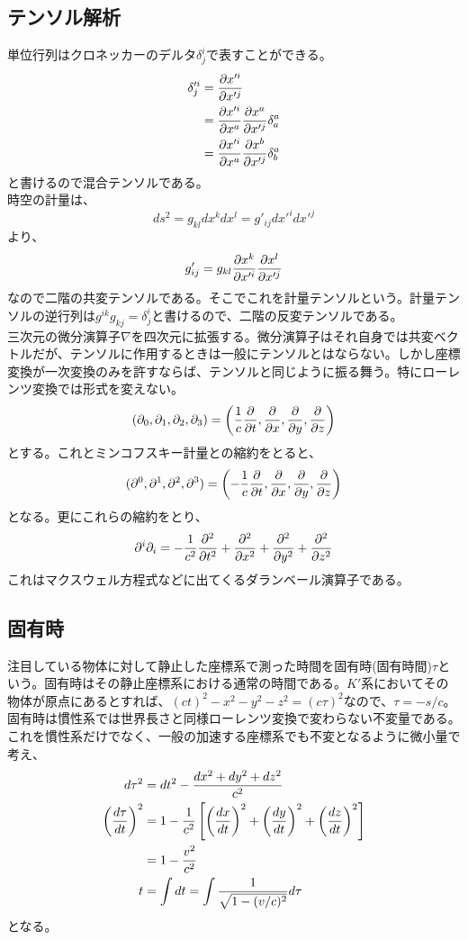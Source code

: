         \subsection{テンソル解析}
            単位行列はクロネッカーのデルタ$\delta^i_j$で表すことができる。
            \begin{align*}
                \delta'^i_j &= \pd[x'^i]{x'^j}\\
                &= \pd[x'^i]{x^a}\pd[x^a]{x'^j}\delta^a_a\\
                &= \pd[x'^i]{x^a}\pd[x^b]{x'^j}\delta^a_b
            \end{align*}
            と書けるので混合テンソルである。\\
            時空の計量は、
                \[ds^2 = g_{kl}dx^kdx^l = g'_{ij}dx'^idx'^j\]
            より、
                \[g'_{ij} = g_{kl}\pd[x^k]{x'^i}\pd[x^l]{x'^j}\]
            なので二階の共変テンソルである。そこでこれを計量テンソルという。計量テンソルの逆行列は$g^{ik}g_{kj}=\delta^i_j$と書けるので、二階の反変テンソルである。\\
            三次元の微分演算子$\nabla$を四次元に拡張する。微分演算子はそれ自身では共変ベクトルだが、テンソルに作用するときは一般にテンソルとはならない。しかし座標変換が一次変換のみを許すならば、テンソルと同じように振る舞う。特にローレンツ変換では形式を変えない。
                \[(\pa_0,\pa_1,\pa_2,\pa_3) = \lr{\rec{c}\pd{t},\pd{x},\pd{y},\pd{z}}\]
            とする。これとミンコフスキー計量との縮約をとると、
                \[(\pa^0,\pa^1,\pa^2,\pa^3) = \lr{-\rec{c}\pd{t},\pd{x},\pd{y},\pd{z}}\]
            となる。更にこれらの縮約をとり、
                \[\pa^i\pa_i = -\rec{c^2}\pd[^2]{t^2} + \pd[^2]{x^2}+\pd[^2]{y^2}+\pd[^2]{z^2}\]
            これはマクスウェル方程式などに出てくるダランベール演算子である。
        \subsection{固有時}
            注目している物体に対して静止した座標系で測った時間を固有時(固有時間)$\tau$という。固有時はその静止座標系における通常の時間である。$K'$系においてその物体が原点にあるとすれば、$(ct)^2-x^2-y^2-z^2=(c\tau)^2$なので、$\tau=-s/c$。固有時は慣性系では世界長さと同様ローレンツ変換で変わらない不変量である。これを慣性系だけでなく、一般の加速する座標系でも不変となるように微小量で考え、
            \begin{align*}
                d\tau^2 &= dt^2-\frac{dx^2+dy^2+dz^2}{c^2}\\
                \lr{\di[\tau]{t}}^2 &= 1-\rec{c^2}\llr{
                \lr{\di[x]{t}}^2+\lr{\di[y]{t}}^2+\lr{\di[z]{t}}^2}\\
                &= 1-\frac{v^2}{c^2}\\
                t &= \int dt = \int \rec{\sqrt{1-(v/c)^2}}d\tau
            \end{align*}
            となる。

